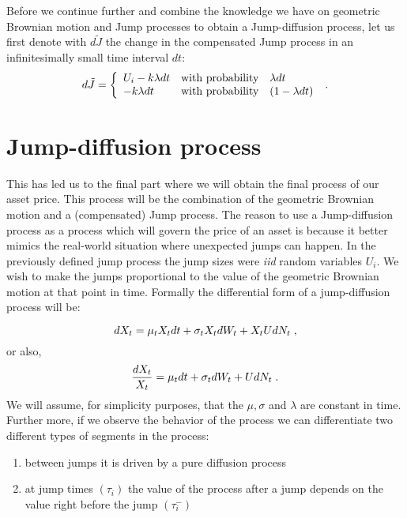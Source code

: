 \documentclass[times, utf8, diplomski]{fer}
\begin{document}
	\noindent Before we continue further and combine the knowledge we have on geometric Brownian motion and Jump processes to obtain a Jump-diffusion process, let us first denote with $d\tilde{J}$ the change in the compensated Jump process in an infinitesimally small time interval $dt$:
	\begin{equation}
		d\tilde{J} = \left\{  \begin{array}{lcl} U_i - k\lambda dt& \mbox{with probability} & \lambda dt \\
																	- k\lambda dt & \mbox{with probability} & (1 - \lambda dt) \end{array} \right.
	 \hspace{0.1cm}.\end{equation}

	\section{Jump-diffusion process}
	This has led us to the final part where we will obtain the final process of our asset price. This process will be the combination of the geometric Brownian motion and a (compensated) Jump process. The reason to use a Jump-diffusion process as a process which will govern the price of an asset is because it better mimics the real-world situation where unexpected jumps can happen. In the previously defined jump process the jump sizes were \textit{iid} random variables $U_i$. We wish to make the jumps proportional to the value of the geometric Brownian motion at that point in time. Formally the differential form of a jump-diffusion process will be:

	\begin{equation} \label{eqn_jd}
		dX_t = \mu_tX_tdt + \sigma_tX_tdW_t + X_tUdN_t \hspace{0.1cm},
	\end{equation} or also,
	\begin{equation} \label{eqn_jd_frac}
		\frac{dX_t}{X_t} = \mu_tdt + \sigma_tdW_t + UdN_t \hspace{0.1cm}.
	\end{equation} 
	We will assume, for simplicity purposes, that the $\mu, \sigma$ and $\lambda$ are constant in time. Further more, if we observe the behavior of the process we can differentiate two different types of segments in the process:
	\begin{enumerate}
		\item between jumps it is driven by a pure diffusion process
		\item at jump times $(\tau_i)$ the value of the process after a jump depends on the value right before the jump $(\tau_i^-)$
	\end{enumerate}
\end{document}

